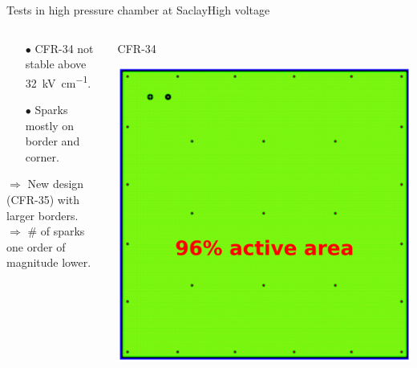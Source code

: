 \documentclass[10pt]{beamer}
\begin{document}
\begin{frame}{Tests in high pressure chamber at Saclay}{High voltage}
\begin{columns}
\begin{column}{0.5\textwidth}
\begin{center}
	    		\end{center}
    		\end{column}
    	\end{columns}\vspace{0.1cm}
    	\begin{columns}
    		\begin{column}{0.5\textwidth}
    			\begin{scriptsize}
	    			\begin{itemize}
	    				\item[$\bullet$] CFR-34 not stable above \SI{32}{\kilo\volt\per\centi\meter}.
	    				\item[$\bullet$] Sparks mostly on border and corner.
	    			\end{itemize}
	    			$\Rightarrow$ New design (CFR-35) with larger borders.\\
	    			$\Rightarrow$ \# of sparks one order of magnitude lower.
	    		\end{scriptsize}
    		\end{column}\hfill
    		\begin{column}{0.5\textwidth}
    			\begin{minipage}{0.48\textwidth}
    				\centering
    				\begin{scriptsize}
	    				CFR-34
	    			\end{scriptsize}
    				\includegraphics[width=.9\textwidth]{figures/666/CFR-34.png}
    			\end{minipage}\hfill

\end{column}
\end{columns}
\end{frame}
\end{document}
